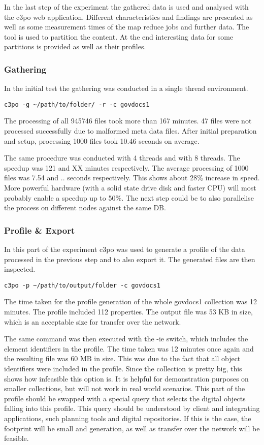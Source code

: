 In the last step of the experiment the gathered data is used and analysed with the c3po web application. Different characteristics and findings are presented as well as some measurement times of the map reduce jobs and further data. The tool is used to partition the content. At the end interesting data for some partitions is provided as well as their profiles.

\subsubsection{Gathering}
In the initial test the gathering was conducted in a single thread environment. 

\begin{verbatim}
c3po -g ~/path/to/folder/ -r -c govdocs1
\end{verbatim}

The processing of all 945746 files took more than 167 minutes. 47 files were not processed successfully due to malformed meta data files. After initial preparation and setup, processing 1000 files took 10.46 seconds on average.

The same procedure was conducted with 4 threads and with 8 threads. The speedup was 121 and XX minutes respectively. The average processing of 1000 files was 7.54 and ..  seconds respectively. This shows about 28\% increase in speed. More powerful hardware (with a solid state drive disk and faster CPU) will most probably enable a speedup up to 50\%. The next step could be to also parallelise the process on different nodes against the same DB.

\subsubsection{Profile \& Export}
In this part of the experiment c3po was used to generate a profile of the data processed in the previous step and to also export it. The generated files are then inspected.

\begin{verbatim}
c3po -p ~/path/to/output/folder -c govdocs1
\end{verbatim}

The time taken for the profile generation of the whole govdocs1 collection was 12 minutes. The profile included 112 properties. The output file was 53 KB in size, which is an acceptable size for transfer over the network.

The same command was then executed with the -ie switch, which includes the element identifiers in the profile.
The time taken was 12 minutes once again and the resulting file was 60 MB in size. This was due to the fact that all object identifiers were included in the profile. Since the collection is pretty big, this shows how infeasible this option is. It is helpful for demonstration purposes on smaller collections, but will not work in real world scenarios. This part of the profile should be swapped with a special query that selects the digital objects falling into this profile. This query should be understood by client and integrating applications, such planning tools and digital repositories. If this is the case, the footprint will be small and generation, as well as transfer over the network will be feasible.


